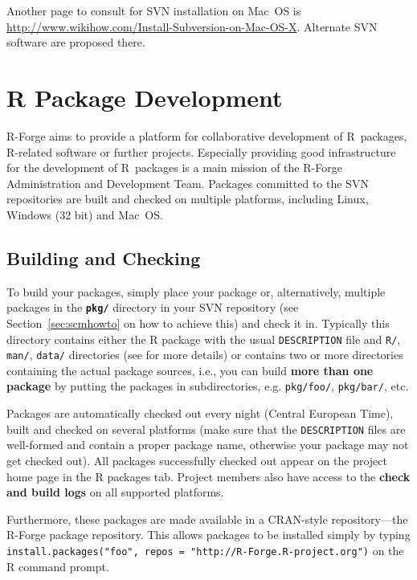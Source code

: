 \documentclass[a4paper]{article}
\newcommand{\RFORGE}{\proglang{R}-Forge Administration and Development Team}
\newcommand{\proglang}[1]{\textsf{#1}}
\begin{document}
Another page to consult for SVN installation on Mac~OS is
\url{http://www.wikihow.com/Install-Subversion-on-Mac-OS-X}. Alternate SVN
software are proposed there. 

\section{R Package Development}

\proglang{R}-Forge aims to provide a platform for collaborative development of
\proglang{R}~packages, \proglang{R}-related software or further
projects. Especially providing good infrastructure for the development of
\proglang{R}~packages is a main mission of the \RFORGE{}. Packages
committed to the SVN repositories are built and checked on multiple
platforms, including Linux, Windows (32 bit) and Mac~OS. 

\subsection{Building and Checking}
To build your packages, simply place your package or, alternatively,
multiple packages in the
\textbf{\texttt{pkg/}} directory in your SVN repository (see 
Section~\ref{sec:scmhowto} on how to achieve this) and check it
in. Typically this directory contains either the R package with the usual
\texttt{DESCRIPTION} file and \texttt{R/}, \texttt{man/},
\texttt{data/} directories (see \cite{Rcore:writing_R_extensions} for more
details) or contains two or more directories containing the actual
package sources, i.e., you can build \textbf{more than one package} by
putting the packages in subdirectories, e.g. \texttt{pkg/foo/}, 
\texttt{pkg/bar/}, etc.

Packages are automatically checked out every night (Central European
Time), built and checked on several platforms (make sure that the
\texttt{DESCRIPTION} files are well-formed and contain a proper 
package name, otherwise your package may not get checked out). All
packages successfully checked out appear on the project home page in
the \proglang{R} packages tab. Project members also have access to the
\textbf{check and build logs} on all supported platforms.  

Furthermore, these packages are made available in a CRAN-style
repository---the
\proglang{R}-Forge package repository. This allows packages to be installed simply by
typing \texttt{install.packages("foo", repos = "http://R-Forge.R-project.org")}
on the \proglang{R} command prompt. 
\end{document}
